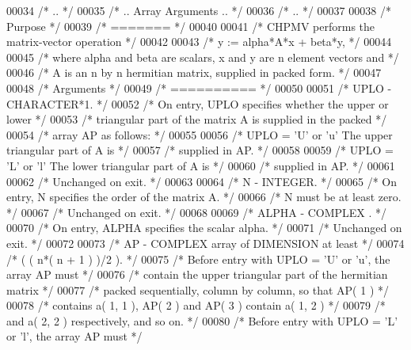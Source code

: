 \begin{DoxyCode}
00034 \textcolor{comment}{/*     .. */}
00035 \textcolor{comment}{/*     .. Array Arguments .. */}
00036 \textcolor{comment}{/*     .. */}
00037 
00038 \textcolor{comment}{/*  Purpose */}
00039 \textcolor{comment}{/*  ======= */}
00040 
00041 \textcolor{comment}{/*  CHPMV  performs the matrix-vector operation */}
00042 
00043 \textcolor{comment}{/*     y := alpha*A*x + beta*y, */}
00044 
00045 \textcolor{comment}{/*  where alpha and beta are scalars, x and y are n element vectors and */}
00046 \textcolor{comment}{/*  A is an n by n hermitian matrix, supplied in packed form. */}
00047 
00048 \textcolor{comment}{/*  Arguments */}
00049 \textcolor{comment}{/*  ========== */}
00050 
00051 \textcolor{comment}{/*  UPLO   - CHARACTER*1. */}
00052 \textcolor{comment}{/*           On entry, UPLO specifies whether the upper or lower */}
00053 \textcolor{comment}{/*           triangular part of the matrix A is supplied in the packed */}
00054 \textcolor{comment}{/*           array AP as follows: */}
00055 
00056 \textcolor{comment}{/*              UPLO = 'U' or 'u'   The upper triangular part of A is */}
00057 \textcolor{comment}{/*                                  supplied in AP. */}
00058 
00059 \textcolor{comment}{/*              UPLO = 'L' or 'l'   The lower triangular part of A is */}
00060 \textcolor{comment}{/*                                  supplied in AP. */}
00061 
00062 \textcolor{comment}{/*           Unchanged on exit. */}
00063 
00064 \textcolor{comment}{/*  N      - INTEGER. */}
00065 \textcolor{comment}{/*           On entry, N specifies the order of the matrix A. */}
00066 \textcolor{comment}{/*           N must be at least zero. */}
00067 \textcolor{comment}{/*           Unchanged on exit. */}
00068 
00069 \textcolor{comment}{/*  ALPHA  - COMPLEX         . */}
00070 \textcolor{comment}{/*           On entry, ALPHA specifies the scalar alpha. */}
00071 \textcolor{comment}{/*           Unchanged on exit. */}
00072 
00073 \textcolor{comment}{/*  AP     - COMPLEX          array of DIMENSION at least */}
00074 \textcolor{comment}{/*           ( ( n*( n + 1 ) )/2 ). */}
00075 \textcolor{comment}{/*           Before entry with UPLO = 'U' or 'u', the array AP must */}
00076 \textcolor{comment}{/*           contain the upper triangular part of the hermitian matrix */}
00077 \textcolor{comment}{/*           packed sequentially, column by column, so that AP( 1 ) */}
00078 \textcolor{comment}{/*           contains a( 1, 1 ), AP( 2 ) and AP( 3 ) contain a( 1, 2 ) */}
00079 \textcolor{comment}{/*           and a( 2, 2 ) respectively, and so on. */}
00080 \textcolor{comment}{/*           Before entry with UPLO = 'L' or 'l', the array AP must */}

\end{DoxyCode}
